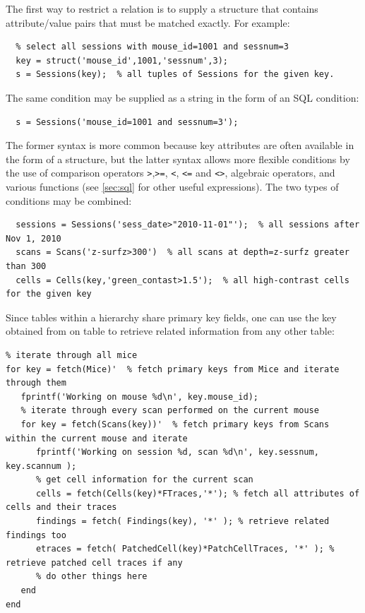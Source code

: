\documentclass[10pt]{article}
\begin{document}
The first way to restrict a relation is to supply a structure that contains attribute/value pairs that must be matched exactly. For example:
\begin{lstlisting}
  % select all sessions with mouse_id=1001 and sessnum=3
  key = struct('mouse_id',1001,'sessnum',3);    
  s = Sessions(key);  % all tuples of Sessions for the given key.
\end{lstlisting}

The same condition may be supplied as a string in the form of an SQL condition:
\begin{lstlisting}
  s = Sessions('mouse_id=1001 and sessnum=3');
\end{lstlisting}

The former syntax is more common because key attributes are often available in the form of a structure, but the latter syntax allows more flexible conditions by the use of comparison operators {\tt>},{\tt>=}, {\tt<}, {\tt<=} and {\tt <>}, algebraic operators, and various functions (see \autoref{sec:sql} for other useful expressions).  The two types of conditions may be combined:
\begin{lstlisting}
  sessions = Sessions('sess_date>"2010-11-01"');  % all sessions after Nov 1, 2010
  scans = Scans('z-surfz>300')  % all scans at depth=z-surfz greater than 300
  cells = Cells(key,'green_contast>1.5');  % all high-contrast cells for the given key 
\end{lstlisting}

Since tables within a hierarchy share primary key fields, one can use the key obtained from on table to retrieve related information from any other table:
\begin{lstlisting}
% iterate through all mice
for key = fetch(Mice)'  % fetch primary keys from Mice and iterate through them
   fprintf('Working on mouse %d\n', key.mouse_id);
   % iterate through every scan performed on the current mouse
   for key = fetch(Scans(key))'  % fetch primary keys from Scans within the current mouse and iterate
      fprintf('Working on session %d, scan %d\n', key.sessnum, key.scannum );
      % get cell information for the current scan
      cells = fetch(Cells(key)*FTraces,'*'); % fetch all attributes of cells and their traces
      findings = fetch( Findings(key), '*' ); % retrieve related findings too
      etraces = fetch( PatchedCell(key)*PatchCellTraces, '*' ); % retrieve patched cell traces if any  
      % do other things here
   end
end
\end{lstlisting}
\end{document}

